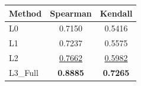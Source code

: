 \begin{tabular}{lcc}
\toprule
Method & Spearman & Kendall\\
\midrule
L0 & 0.7150 & 0.5416 \\
L1 & 0.7237 & 0.5575 \\
L2 & \underline{0.7662} & \underline{0.5982} \\
L3_Full & \textbf{0.8885} & \textbf{0.7265} \\
\bottomrule
\end{tabular}